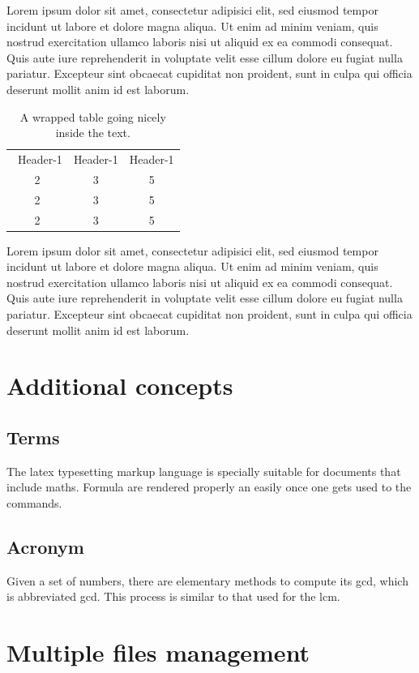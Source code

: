\documentclass[a4paper, oneside]{book}
\begin{document}
Lorem ipsum dolor sit amet, consectetur adipisici elit, sed eiusmod tempor incidunt ut labore et dolore magna aliqua. Ut enim ad minim veniam, quis nostrud exercitation ullamco laboris nisi ut aliquid ex ea commodi consequat. Quis aute iure reprehenderit in voluptate velit esse cillum dolore eu fugiat nulla pariatur. Excepteur sint obcaecat cupiditat non proident, sunt in culpa qui officia deserunt mollit anim id est laborum.
\begin{table}
\caption{A wrapped table going nicely inside the text.}\label{wrap-tab:1}
\begin{tabular}{ccc}\  
Header-1 & Header-1 & Header-1 \\
2 &3 & 5\\  
2 &3 & 5\\  
2 &3 & 5\\  
\end{tabular}
\end{table}
Lorem ipsum dolor sit amet, consectetur adipisici elit, sed eiusmod tempor incidunt ut labore et dolore magna aliqua. Ut enim ad minim veniam, quis nostrud exercitation ullamco laboris nisi ut aliquid ex ea commodi consequat. Quis aute iure reprehenderit in voluptate velit esse cillum dolore eu fugiat nulla pariatur. Excepteur sint obcaecat cupiditat non proident, sunt in culpa qui officia deserunt mollit anim id est laborum.

\chapter{Additional concepts}

\section{Terms} 

The \Gls{latex} typesetting markup language is specially suitable 
for documents that include maths. Formula are rendered 
properly an easily once one gets used to the commands.

\section{Acronym}

Given a set of numbers, there are elementary methods to compute 
its \ac{gcd}, which is abbreviated gcd. This 
process is similar to that used for the lcm.

\chapter{Multiple files management}
\end{document}
